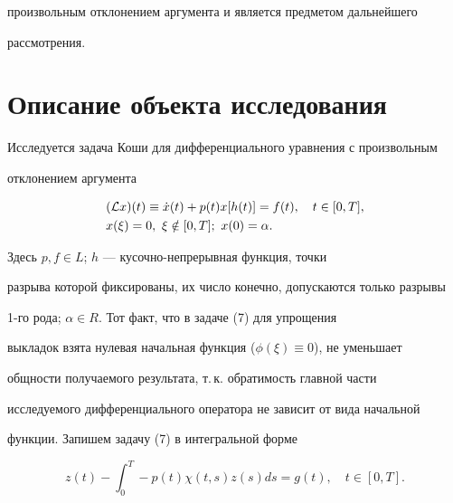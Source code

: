 произвольным отклонением аргумента и является предметом дальнейшего


рассмотрения.





\section{Описание объекта исследования}





Исследуется задача Коши для дифференциального уравнения с произвольным


отклонением аргумента


%


\begin{align}


\begin{split}


& ({\cal L}x)(t) \equiv \Dot x(t)+p(t)x[h(t)]=f(t),


\quad t \in [0,T], \\


& x(\xi ) =0, \ \xi \notin [0,T]; \ x(0)=\alpha.


\end{split}


\end{align}


%


Здесь $p, f \in L$; $h$ --- кусочно-непрерывная функция, точки


разрыва которой фиксированы, их число конечно, допускаются только разрывы


1-го рода; $\alpha \in R$. Тот факт, что в задаче (7) для упрощения


выкладок взята нулевая начальная функция ($\phi(\xi)\equiv0$), не уменьшает


общности получаемого результата, т.\,к. обратимость главной части


исследуемого дифференциального оператора не зависит от вида начальной


функции. Запишем задачу (7) в интегральной форме


%


\begin{equation}


z(t) - \int_0^T -p(t) \chi (t,s) z(s) ds = g(t),


\quad t \in [0,T].


\end{equation}


